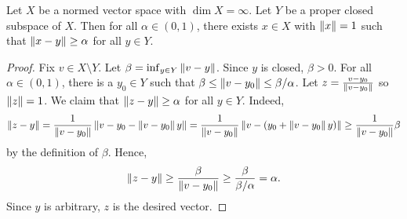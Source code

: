 \begin{lemma}[Riesz]
    Let $X$ be a normed vector space with $\dim X = \infty$. 
    Let $Y$ be a proper closed subspace of $X$. Then for all 
    $\alpha\in(0,1)$, there exists $x\in X$ with $\left\lVert {x} \right\rVert = 1$ 
    such that $\left\lVert {x-y} \right\rVert\geq \alpha$ for all $y\in Y$.
\end{lemma}
\begin{proof}
    Fix $v\in X\setminus Y$. Let $\beta = \inf_{y\in Y} \left\lVert {v - y} \right\rVert$. 
    Since $y$ is closed, $\beta > 0$. For all $\alpha\in (0,1)$, 
    there is a $y_0\in Y$ such that $\beta\leq\left\lVert {v - y_0} \right\rVert\leq \beta/\alpha$. 
    Let $z = \frac{v-y_0}{\left\lVert {v-y_0} \right\rVert}$ so $\left\lVert {z} \right\rVert = 1$. We claim 
    that $\left\lVert {z-y} \right\rVert\geq \alpha$ for all $y\in Y$. Indeed, 
    \begin{equation*}
        \left\lVert {z-y} \right\rVert = \frac{1}{\left\lVert {v-y_0} \right\rVert}\left\lVert {v - y_0 - \left\lVert {v-y_0} \right\rVert y} \right\rVert 
        = \frac{1}{\left\lVert {v-y_0} \right\rVert}\left\lVert {v - (y_0 + \left\lVert {v-y_0} \right\rVert y)} \right\rVert 
        \geq \frac{1}{\left\lVert {v-y_0} \right\rVert}\beta
    \end{equation*}
    by the definition of $\beta$. Hence, 
    \begin{equation*}
        \left\lVert {z-y} \right\rVert \geq \frac{\beta}{\left\lVert {v-y_0} \right\rVert} 
        \geq \frac{\beta}{\beta/\alpha} = \alpha. 
    \end{equation*}
    Since $y$ is arbitrary, $z$ is the desired vector.
\end{proof}

